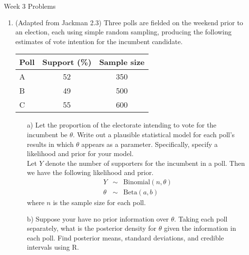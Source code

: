 \documentclass[10pt,a4paper]{article}
\author{Patrick Lam}
\newcommand{\red}{\color{red}}
\newcommand{\black}{\color{black}}
\begin{document}
\begin{center}
\begin{Large}Week 3 Problems\end{Large}
\end{center}
\bigskip
\begin{enumerate}

\item (Adapted from Jackman 2.3) Three polls are fielded on the weekend prior to an election, each using simple random sampling, producing the following estimates of vote intention for the incumbent candidate.
\medskip

\begin{center}
\begin{tabular}{lcc}
\hline
Poll & Support (\%) & Sample size \\
\hline
A & 52 & 350 \\
B & 49 & 500 \\
C & 55 & 600 \\
\hline
\end{tabular}
\end{center}
\medskip
\begin{itemize}
\item[a)] Let the proportion of the electorate intending to vote for the incumbent be $\theta$.  Write out a plausible statistical model for each poll's results in which $\theta$ appears as a parameter.  Specifically, specify a likelihood and prior for your model. \\

\medskip \red
Let $Y$ denote the number of supporters for the incumbent in a poll.  Then we have the following likelihood and prior.
\begin{eqnarray*}
Y &\sim& \mathrm{Binomial}(n, \theta) \\
\theta &\sim& \mathrm{Beta}(a,b)
\end{eqnarray*}
where $n$ is the sample size for each poll. \\
\medskip \black 

\item[b)] Suppose your have no prior information over $\theta$.  Taking each poll separately, what is the posterior density for $\theta$ given the information in each poll.  Find posterior means, standard deviations, and credible intervals using R. \\


\end{itemize}
\end{enumerate}
\end{document}

